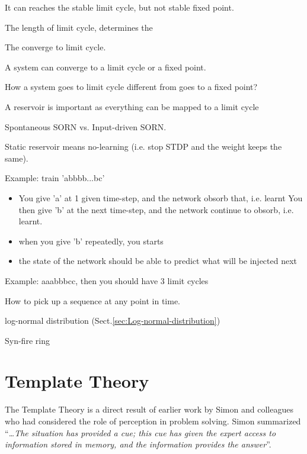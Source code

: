 It can reaches the stable limit cycle, but not stable fixed point.

The length of limit cycle, determines the 

The converge to limit cycle. 

A system can converge to a limit cycle or a fixed point.

How a system goes to limit cycle different from goes to a fixed point?

A reservoir is important as everything can be mapped to a limit cycle

Spontaneous SORN vs. Input-driven SORN.

Static reservoir means no-learning (i.e. stop STDP and the weight keeps the
same).

Example: train 'abbbb...bc'
\begin{itemize}

  \item You give 'a' at 1 given time-step, and the network obsorb that, i.e. learnt
You then give 'b' at the next time-step, and the network continue to obsorb,
i.e. learnt.

  \item when you give 'b' repeatedly, you starts 
  

  \item the state of the network should be able to predict what will be injected
  next
  
\end{itemize}

Example: aaabbbcc, then you should have 3 limit cycles


How to pick up a sequence at any point in time. 




log-normal distribution (Sect.\ref{sec:Log-normal-distribution})


Syn-fire ring 



\section{Template Theory}
\label{sec:learning_Template-Theory}

The Template Theory is a direct result of earlier work by Simon and colleagues
who had considered the role of perception in problem solving.
Simon summarized ``{\it \ldots The situation has provided a cue; this cue has
given the expert access to information stored in memory, and the information
provides the answer}''.

